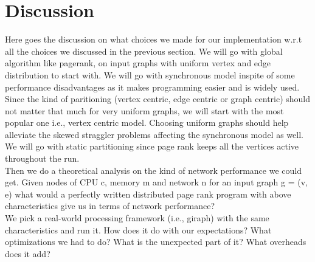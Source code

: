 \section{Discussion}
\label{sec:discussion}

Here goes the discussion on what choices we made for our implementation w.r.t 
all the choices we discussed in the previous section. We will go with global
algorithm like pagerank, on input graphs with uniform vertex and edge 
distribution to start with. We will go with synchronous model inspite of some
performance disadvantages as it makes programming easier and is widely used. 
Since the kind of paritioning (vertex centric, edge centric or graph centric) 
should not matter that much for very uniform graphs, we will start with the most 
popular one i.e., vertex centric model. Choosing uniform graphs should help 
alleviate the skewed straggler problems affecting the synchronous model as well.
We will go with static partitioning since page rank keeps all the vertices active
throughout the run. \\

Then we do a theoretical analysis on the kind of network performance we could 
get. Given nodes of CPU c, memory m and network n for an input graph g = (v, e)
what would a perfectly written distributed page rank program with above 
characteristics give us in terms of network performance? \\

We pick a real-world processing framework (i.e., giraph) with the same
characteristics and run it. How does it do with our expectations? What 
optimizations we had to do? What is the unexpected part of it? What overheads
does it add?

